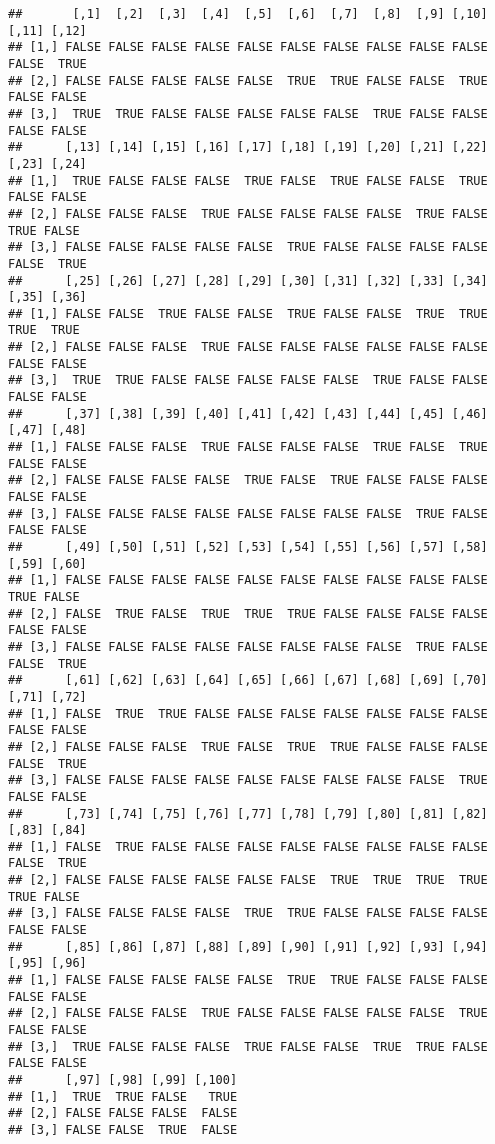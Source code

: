 \documentclass[
]{article}
\begin{document}
\begin{verbatim}
##       [,1]  [,2]  [,3]  [,4]  [,5]  [,6]  [,7]  [,8]  [,9] [,10] [,11] [,12]
## [1,] FALSE FALSE FALSE FALSE FALSE FALSE FALSE FALSE FALSE FALSE FALSE  TRUE
## [2,] FALSE FALSE FALSE FALSE FALSE  TRUE  TRUE FALSE FALSE  TRUE FALSE FALSE
## [3,]  TRUE  TRUE FALSE FALSE FALSE FALSE FALSE  TRUE FALSE FALSE FALSE FALSE
##      [,13] [,14] [,15] [,16] [,17] [,18] [,19] [,20] [,21] [,22] [,23] [,24]
## [1,]  TRUE FALSE FALSE FALSE  TRUE FALSE  TRUE FALSE FALSE  TRUE FALSE FALSE
## [2,] FALSE FALSE FALSE  TRUE FALSE FALSE FALSE FALSE  TRUE FALSE  TRUE FALSE
## [3,] FALSE FALSE FALSE FALSE FALSE  TRUE FALSE FALSE FALSE FALSE FALSE  TRUE
##      [,25] [,26] [,27] [,28] [,29] [,30] [,31] [,32] [,33] [,34] [,35] [,36]
## [1,] FALSE FALSE  TRUE FALSE FALSE  TRUE FALSE FALSE  TRUE  TRUE  TRUE  TRUE
## [2,] FALSE FALSE FALSE  TRUE FALSE FALSE FALSE FALSE FALSE FALSE FALSE FALSE
## [3,]  TRUE  TRUE FALSE FALSE FALSE FALSE FALSE  TRUE FALSE FALSE FALSE FALSE
##      [,37] [,38] [,39] [,40] [,41] [,42] [,43] [,44] [,45] [,46] [,47] [,48]
## [1,] FALSE FALSE FALSE  TRUE FALSE FALSE FALSE  TRUE FALSE  TRUE FALSE FALSE
## [2,] FALSE FALSE FALSE FALSE  TRUE FALSE  TRUE FALSE FALSE FALSE FALSE FALSE
## [3,] FALSE FALSE FALSE FALSE FALSE FALSE FALSE FALSE  TRUE FALSE FALSE FALSE
##      [,49] [,50] [,51] [,52] [,53] [,54] [,55] [,56] [,57] [,58] [,59] [,60]
## [1,] FALSE FALSE FALSE FALSE FALSE FALSE FALSE FALSE FALSE FALSE  TRUE FALSE
## [2,] FALSE  TRUE FALSE  TRUE  TRUE  TRUE FALSE FALSE FALSE FALSE FALSE FALSE
## [3,] FALSE FALSE FALSE FALSE FALSE FALSE FALSE FALSE  TRUE FALSE FALSE  TRUE
##      [,61] [,62] [,63] [,64] [,65] [,66] [,67] [,68] [,69] [,70] [,71] [,72]
## [1,] FALSE  TRUE  TRUE FALSE FALSE FALSE FALSE FALSE FALSE FALSE FALSE FALSE
## [2,] FALSE FALSE FALSE  TRUE FALSE  TRUE  TRUE FALSE FALSE FALSE FALSE  TRUE
## [3,] FALSE FALSE FALSE FALSE FALSE FALSE FALSE FALSE FALSE  TRUE FALSE FALSE
##      [,73] [,74] [,75] [,76] [,77] [,78] [,79] [,80] [,81] [,82] [,83] [,84]
## [1,] FALSE  TRUE FALSE FALSE FALSE FALSE FALSE FALSE FALSE FALSE FALSE  TRUE
## [2,] FALSE FALSE FALSE FALSE FALSE FALSE  TRUE  TRUE  TRUE  TRUE  TRUE FALSE
## [3,] FALSE FALSE FALSE FALSE  TRUE  TRUE FALSE FALSE FALSE FALSE FALSE FALSE
##      [,85] [,86] [,87] [,88] [,89] [,90] [,91] [,92] [,93] [,94] [,95] [,96]
## [1,] FALSE FALSE FALSE FALSE FALSE  TRUE  TRUE FALSE FALSE FALSE FALSE FALSE
## [2,] FALSE FALSE FALSE  TRUE FALSE FALSE FALSE FALSE FALSE  TRUE FALSE FALSE
## [3,]  TRUE FALSE FALSE FALSE  TRUE FALSE FALSE  TRUE  TRUE FALSE FALSE FALSE
##      [,97] [,98] [,99] [,100]
## [1,]  TRUE  TRUE FALSE   TRUE
## [2,] FALSE FALSE FALSE  FALSE
## [3,] FALSE FALSE  TRUE  FALSE
\end{verbatim}
\end{document}
